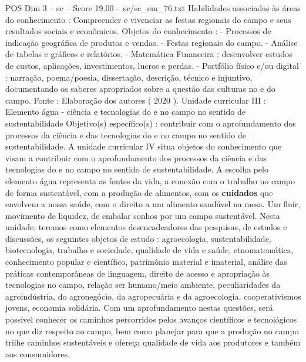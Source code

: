 \begin{textsample}{POS Dim 3 – sc – Score 19.00 – sc/sc\_em\_76.txt}
Habilidades associadas às áreas do conhecimento : Compreender e vivenciar as festas regionais do campo e seus resultados sociais e econômicos.
Objetos do conhecimento : - Processos de indicação geográfica de produtos e vendas. - Festas regionais do campo. - Análise de tabelas e gráficos e relatórios. - Matemática Financeira : desenvolver estudos de custos, aplicações, investimentos, lucros e perdas. - Portfólio físico e/ou digital : narração, poema/poesia, dissertação, descrição, técnico e injuntivo, documentando os saberes apropriados sobre a questão das culturas no e do campo.
Fonte : Elaboração dos autores ( 2020 ).
Unidade curricular III : Elemento água - ciência e tecnologias do e no campo no sentido de sustentabilidade Objetivo(s) específico(s) : contribuir com o aprofundamento dos processos da ciência e das tecnologias do e no campo no sentido de sustentabilidade.
A unidade curricular IV situa objetos do conhecimento que visam a contribuir com o aprofundamento dos processos da ciência e das tecnologias do e no campo no sentido de sustentabilidade.
A escolha pelo elemento água representa as fontes da vida, a conexão com o trabalho no campo de forma sustentável, com a produção de alimentos, com os \textbf{cuidados} que envolvem a nossa saúde, com o direito a um alimento saudável na mesa.
Um fluir, movimento de liquidez, de embalar sonhos por um campo sustentável.
Nesta unidade, teremos como elementos desencadeadores das pesquisas, de estudos e discussões, os seguintes objetos de estudo : agroecologia, sustentabilidade, biotecnologia, trabalho e sociedade, qualidade de vida e saúde, etnomatemática, conhecimento popular e científico, patrimônio material e imaterial, análise das práticas contemporâneas de linguagem, direito de acesso e apropriação às tecnologias no campo, relação ser humano/meio ambiente, peculiaridades da agroindústria, do agronegócio, da agropecuária e da agroecologia, cooperativismos jovens, economia solidária.
Com um aprofundamento nestas questões, será possível conhecer os caminhos percorridos pelos avanços científicos e tecnológicos no que diz respeito ao campo, bem como planejar para que a produção no campo trilhe caminhos sustentáveis e ofereça qualidade de vida aos produtores e também aos consumidores.

\end{textsample}
